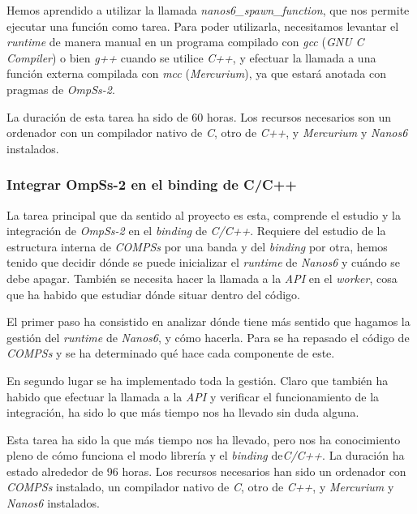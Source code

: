 Hemos aprendido a utilizar la llamada \textit{nanos6\_spawn\_function}, que nos permite ejecutar una función como tarea. Para poder utilizarla, necesitamos levantar el \textit{runtime} de manera manual en un programa compilado con \textit{gcc} (\textit{GNU C Compiler}) o bien \textit{g++} cuando se utilice \textit{C++}, y efectuar la llamada a una función externa compilada con \textit{mcc} (\textit{Mercurium}), ya que estará anotada con pragmas de \textit{OmpSs-2}.
\par\bigskip

La duración de esta tarea ha sido de 60 horas. Los recursos necesarios son un ordenador con un compilador nativo de \textit{C}, otro de \textit{C++}, y \textit{Mercurium} y \textit{Nanos6} instalados. 

\subsubsection{Integrar OmpSs-2 en el binding de C/C++}

La tarea principal que da sentido al proyecto es esta, comprende el estudio y la integración de \textit{OmpSs-2} en el \textit{binding} de \textit{C/C++}. Requiere del estudio de la estructura interna de \textit{COMPSs} por una banda y del \textit{binding} por otra, hemos tenido que decidir dónde se puede inicializar el \textit{runtime} de \textit{Nanos6} y cuándo se debe apagar. También se necesita hacer la llamada a la \textit{API} en el \textit{worker}, cosa que ha habido que estudiar dónde situar dentro del código.
\par\bigskip

El primer paso ha consistido en analizar dónde tiene más sentido que hagamos la gestión del \textit{runtime} de \textit{Nanos6}, y cómo hacerla. Para se ha repasado el código de \textit{COMPSs} y se ha determinado qué hace cada componente de este. 

En segundo lugar se ha implementado toda la gestión. Claro que también ha habido que efectuar la llamada a la \textit{API} y verificar el funcionamiento de la integración, ha sido lo que más tiempo nos ha llevado sin duda alguna.

Esta tarea ha sido la que más tiempo nos ha llevado, pero nos ha conocimiento pleno de cómo funciona el modo librería y el \textit{binding} de\textit{C/C++}. La duración ha estado alrededor de 96 horas. Los recursos necesarios han sido un ordenador con \textit{COMPSs} instalado, un compilador nativo de \textit{C}, otro de \textit{C++}, y \textit{Mercurium} y \textit{Nanos6} instalados.

